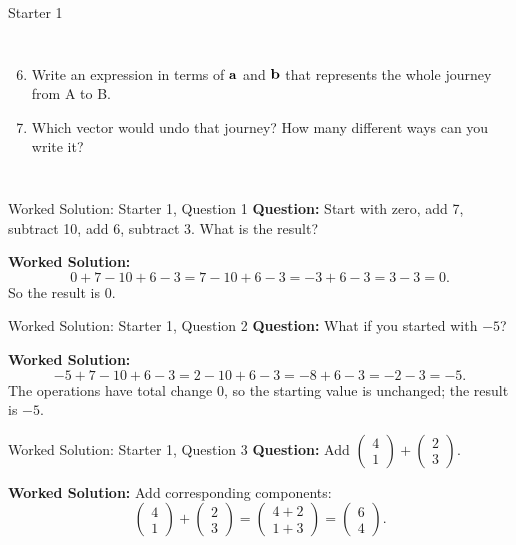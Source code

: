 \documentclass{beamer}
\newcommand{\ashow}[1]{\uncover<2->{\textcolor{red}{\small #1}}}
\begin{document}
\begin{frame}{Starter 1}
\begin{columns}[T]

\begin{enumerate}
    \setcounter{enumi}{5}
  \item Write an expression in terms of $\bf{a}$ and $\bf{b}$ that represents the whole journey from A to B. \ashow{\(\mathbf{a}+\mathbf{b}\)}
  \item Which vector would undo that journey? How many different ways can you write it? \ashow{\(\overrightarrow{BA} = -(\mathbf{a}+\mathbf{b}) = -\mathbf{a}-\mathbf{b}\)}
\end{enumerate}

\end{columns}

\end{frame}

\begin{frame}{Worked Solution: Starter 1, Question 1}
\hypertarget{work-st1}{}
\textbf{Question:} Start with zero, add 7, subtract 10, add 6, subtract 3. What is the result?

\textbf{Worked Solution:}
\[
0+7-10+6-3 = 7-10+6-3 = -3+6-3 = 3-3 = 0.
\]
So the result is \(0\).

\end{frame}

\begin{frame}{Worked Solution: Starter 1, Question 2}
\textbf{Question:} What if you started with $-5$?

\textbf{Worked Solution:}
\[
-5+7-10+6-3 = 2-10+6-3 = -8+6-3 = -2-3 = -5.
\]
The operations have total change \(0\), so the starting value is unchanged; the result is \(-5\).

\end{frame}

\begin{frame}{Worked Solution: Starter 1, Question 3}
\textbf{Question:} Add \(\begin{pmatrix}4\\1\end{pmatrix} + \begin{pmatrix}2\\3\end{pmatrix}\).

\textbf{Worked Solution:}
Add corresponding components:
\[
\begin{pmatrix}4\\1\end{pmatrix}
+
\begin{pmatrix}2\\3\end{pmatrix}
=
\begin{pmatrix}4+2\\1+3\end{pmatrix}
=
\begin{pmatrix}6\\4\end{pmatrix}.
\]

\end{frame}
\end{document}
